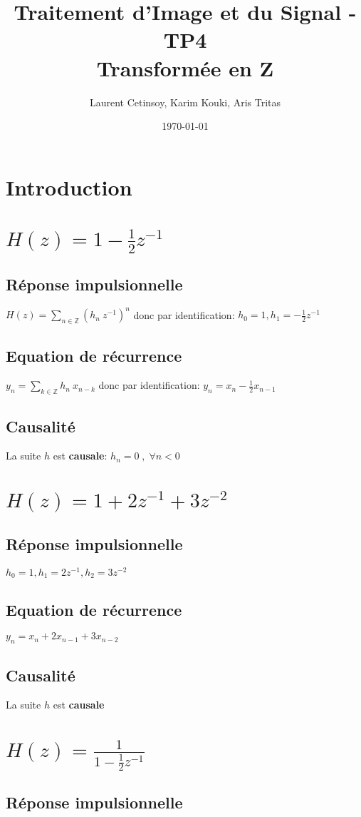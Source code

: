 \documentclass{article}
\title{Traitement d'Image et du Signal - TP4 \\ Transformée en Z}
\author{Laurent Cetinsoy, Karim Kouki, Aris Tritas }
\date{\today}
\begin{document}
\maketitle
\section*{Introduction}
\section{$H(z) = 1 - \frac{1}{2}z^{-1}$}
\subsection*{Réponse impulsionnelle}
$H(z) = \displaystyle\sum_{n \in \mathbb{Z}}{(h_n  \: z^{-1})^{n}}$ donc par identification:
$h_0 = 1, h_1 = -\frac{1}{2}z^{-1}$
\subsection*{Equation de récurrence}
$y_n = \displaystyle\sum_{k \in \mathbb{Z}}{h_n  \: x_{n-k}}$ donc par identification:
$y_n = x_n - \frac{1}{2}x_{n-1}$
\subsection*{Causalité}
La suite $h$ est \textbf{causale}: $h_n = 0 \;,\; \forall n < 0$
\section{$H(z) = 1 +2z^{-1} +3z^{-2}$}
\subsection*{Réponse impulsionnelle}
$h_0 = 1, h_1 = 2z^{-1}, h_2 = 3z^{-2}$
\subsection*{Equation de récurrence}
$y_n = x_n +2x_{n-1} +3x_{n-2}$
\subsection*{Causalité}
La suite $h$ est \textbf{causale}
\section{$H(z) = \frac{1}{1 - \frac{1}{2}z^{-1}}$}
\subsection*{Réponse impulsionnelle}
\end{document}
